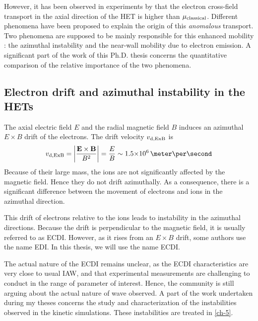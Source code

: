   
  However, it has been observed in experiments by \citet{meezan2001} that the electron cross-field transport in the axial direction of the \ac{HET} is higher than $\mu_{\mathrm{classical}}$.
  Different phenomena have been proposed to explain the origin of this \emph{anomalous} transport.
  Two phenomena are supposed to be mainly responsible for this enhanced mobility \citep{croes2017}\string: the azimuthal instability and the near-wall mobility due to electron emission.
  A significant part of the work of this Ph.D. thesis concerns the quantitative comparison of the relative importance of the two phenomena.

  
  \subsection*{Electron drift and azimuthal instability in the HETs}

  The axial electric field $E$ and the radial magnetic field $B$ induces an azimuthal $E\times B$ drift of the electrons.
  The drift velocity $v_{\rm d, ExB}$ is 
  \begin{equation} \label{eq-exbdriftbis}
    v_{\rm d, ExB} = \bigg\lvert \frac{\vect{E} \times \vect{B}}{B^2} \bigg\rvert = \frac{E}{B} \sim \sn{1.5}{6} \,\meter\per\second
  \end{equation}
  Because of their large mass, the ions are not significantly affected by the magnetic field.
  Hence they do not drift azimuthally.
  As a consequence, there is a significant difference between the movement of electrons and ions in the azimuthal direction.

  This drift of electrons relative to the ions leads to instability in the azimuthal directions.
  Because the drift is perpendicular to the magnetic field, it is usually referred to as \ac{ECDI}.
  However, as it rises from an $E\times B$ drift, some authors use the name \ac{EDI}.
  In this thesis, we will use the name \ac{ECDI}.

  The actual nature of the \ac{ECDI} remains unclear\citep{boeuf2018}, as the \ac{ECDI} characteristics are very close to usual \ac{IAW}, and that experimental measurements are challenging to conduct in the range of parameter of interest.
  Hence, the community is still arguing about the actual nature of wave observed.
  A part of the work undertaken during my theses concerns the study and characterization of the instabilities observed in the kinetic simulations.
  These instabilities are treated in \cref{ch-5}.
  
